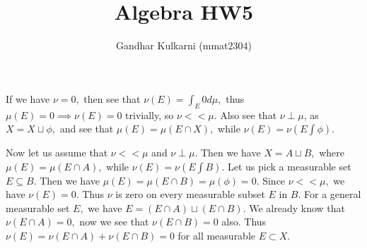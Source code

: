 \documentclass{article}
\title{Algebra HW5} %
\author{Gandhar Kulkarni (mmat2304)} %
\date{} %
\begin{document}
\maketitle %


\section{} %
If we have $\nu=0,$ then see that $\nu(E)=\int_{E}0 d\mu,$ thus $\mu(E)=0 \implies \nu(E)=0$ trivially, so $\nu << \mu.$ Also see that $\nu \perp \mu$, as 
$X= X \sqcup \phi,$ and see that $\mu(E)=\mu(E \cap X),$ while $\nu(E)=\nu(E \int \phi).$ 

Now let us assume that $\nu << \mu$ and $\nu \perp \mu.$ Then we have $X=A \sqcup B,$ where $\mu(E)=\mu(E \cap A),$ while $\nu(E)=\nu(E \int B).$ Let us 
pick a measurable set $E \subseteq B.$ Then we have $\mu(E)=\mu(E \cap B)=\mu(\phi)=0.$ Since $\nu << \mu,$ we have $\nu(E)=0.$ Thus $\nu$ is zero on every 
measurable subset $E$ in $B.$ For a general measurable set $E,$ we have $E=(E \cap A) \sqcup (E \cap B).$ We already know that $\nu(E\cap A)=0,$ now we see 
that $\nu(E \cap B)=0$ also. Thus $\nu(E)=\nu(E \cap A)+\nu(E \cap B)=0$ for all measurable $E \subset X.$
\section{} %
\section{} %
\end{document}
